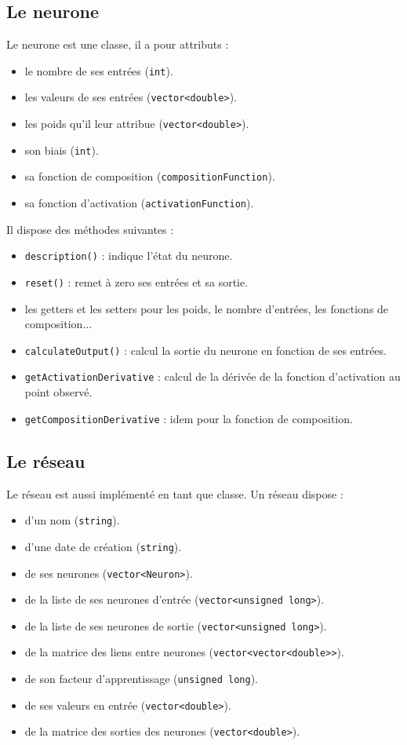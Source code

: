 \subsection{Le neurone}

Le neurone est une classe, il a pour attributs :
\begin{itemize}
  \item le nombre de ses entrées (\verb+int+).
  \item les valeurs de ses entrées (\verb+vector<double>+).
  \item les poids qu'il leur attribue (\verb+vector<double>+).
  \item son biais (\verb+int+).
  \item sa fonction de composition (\verb+compositionFunction+).
  \item sa fonction d'activation (\verb+activationFunction+).
\end{itemize}

\medskip

Il dispose des méthodes suivantes :
\begin{itemize}
  \item \verb+description()+ : indique l'état du neurone.
  \item \verb+reset()+ : remet à zero ses entrées et sa sortie.
  \item les getters et les setters pour les poids, le nombre d'entrées, les
  fonctions de composition...
  \item \verb+calculateOutput()+ : calcul la sortie du neurone en fonction
  de ses entrées.
  \item \verb+getActivationDerivative+ : calcul de la dérivée de la fonction
  d'activation au point observé.
  \item \verb+getCompositionDerivative+ : idem pour la fonction de composition.
\end{itemize}

\subsection{Le réseau}

Le réseau est aussi implémenté en tant que classe.
Un réseau dispose :
\begin{itemize}
  \item d'un nom (\verb+string+).
  \item d'une date de création (\verb+string+).
  \item de ses neurones (\verb+vector<Neuron>+).
  \item de la liste de ses neurones d'entrée (\verb+vector<unsigned long>+).
  \item de la liste de ses neurones de sortie (\verb+vector<unsigned long>+).
  \item de la matrice des liens entre neurones (\verb+vector<vector<double>>+).
  \item de son facteur d'apprentissage (\verb+unsigned long+).
  \item de ses valeurs en entrée (\verb+vector<double>+).
  \item de la matrice des sorties des neurones (\verb+vector<double>+).
\end{itemize}

